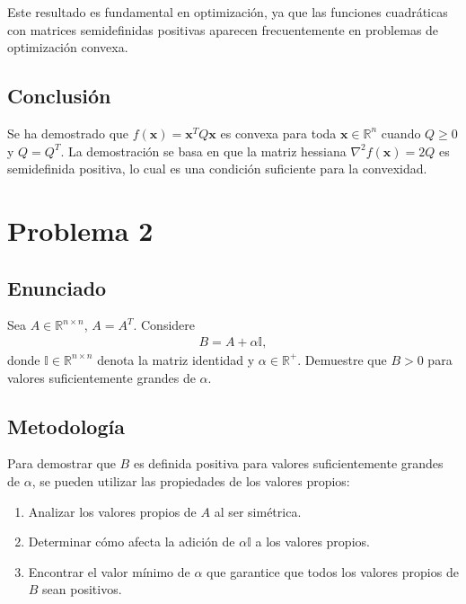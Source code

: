 \documentclass{article}
\begin{document}
Este resultado es fundamental en optimización, ya que las funciones cuadráticas con matrices semidefinidas positivas aparecen frecuentemente en problemas de optimización convexa.

\subsection{Conclusión}

Se ha demostrado que $f(\mathbf{x}) = \mathbf{x}^T Q \mathbf{x}$ es convexa para toda $\mathbf{x} \in \mathbb{R}^n$ cuando $Q \geq 0$ y $Q = Q^T$. La demostración se basa en que la matriz hessiana $\nabla^2 f(\mathbf{x}) = 2Q$ es semidefinida positiva, lo cual es una condición suficiente para la convexidad. 


\section{Problema 2}

\subsection{Enunciado}
Sea $A \in \mathbb{R}^{n \times n}$, $A = A^T$. Considere  
\begin{align*}
    B = A + \alpha \mathbb{I},
\end{align*}
donde $\mathbb{I} \in \mathbb{R}^{n \times n}$ denota la matriz identidad y $\alpha \in \mathbb{R}^{+}$. Demuestre que $B > 0$ para valores suficientemente grandes de $\alpha$.

\subsection{Metodología}

Para demostrar que $B$ es definida positiva para valores suficientemente grandes de $\alpha$, se pueden utilizar las propiedades de los valores propios:
\begin{enumerate}
    \item Analizar los valores propios de $A$ al ser simétrica.
    \item Determinar cómo afecta la adición de $\alpha \mathbb{I}$ a los valores propios.
    \item Encontrar el valor mínimo de $\alpha$ que garantice que todos los valores propios de $B$ sean positivos.
\end{enumerate}
\end{document}

